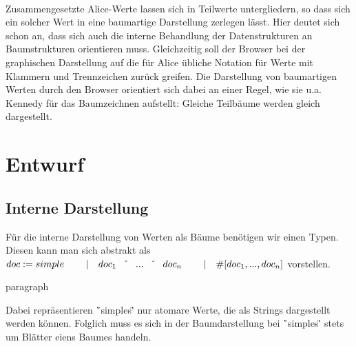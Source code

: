 \documentclass[12pt,a4paper]{article}
\begin{document}
\paragraph{}

Zusammengesetzte Alice-Werte lassen sich in Teilwerte untergliedern, 
so dass sich ein solcher Wert 
in eine baumartige Darstellung zerlegen l\"asst.
Hier deutet sich schon an, 
dass sich auch die interne Behandlung der Datenstrukturen 
an Baumstrukturen orientieren muss. Gleichzeitig soll der Browser 
bei der graphischen Darstellung auf 
die f\"ur Alice \"ubliche Notation f\"ur 
Werte mit Klammern und Trennzeichen 
zur\"uck greifen.    
Die Darstellung von baumartigen Werten durch 
den Browser orientiert sich dabei 
an einer Regel, wie sie u.a. Kennedy \cite{ke:dr} f\"ur 
das Baumzeichnen aufstellt: Gleiche Teilb\"aume werden 
gleich dargestellt. 



\section{Entwurf}


\subsection{Interne Darstellung}
F\"ur die interne Darstellung von Werten als B\"aume ben\"otigen wir einen 
Typen. Diesen kann man sich abstrakt als \\[2mm]
\begin{math}
doc :=  simple \\  
\hspace*{8mm} | \quad  doc_{1} \quad \hat{} \quad ... \quad \hat{} 
                \quad doc_{n} \\         
\hspace*{8mm} | \quad  
\# \lbrack doc_{1}, ... , doc_{n}\rbrack 
\\[2mm]
\end{math}
vorstellen. 

paragraph{}

Dabei repr\"asentieren \"`simples\"' nur atomare Werte, die als Strings 
dargestellt werden k\"onnen. Folglich muss es sich in der Baumdarstellung 
bei \"`simples\"' stets um Bl\"atter eiens Baumes handeln.
\end{document}
